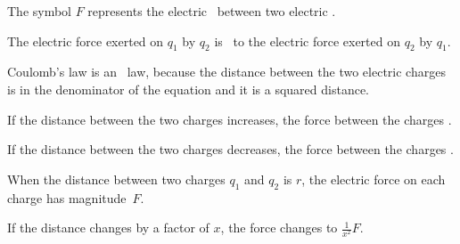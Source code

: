 \documentclass[]{exam}
\begin{document}
\begin{questions}
\question
The symbol $F$ represents the electric \fillin[force][3cm]\ between two electric \fillin[charges][3cm].

\question
The electric force exerted on $q_1$ by $q_2$ is \fillin[equal][3cm]\ to the electric force exerted on $q_2$ by $q_1$.

\question
Coulomb's law is an \ law, because the distance between the two electric charges is in the denominator of the equation and it is a squared distance.

\question 
If the distance between the two charges increases, the force between the charges \fillin[decreases][3cm].

\question
If the distance between the two charges decreases, the force between the charges \fillin[increases][3cm].

\question
When the distance between two charges $q_1$ and $q_2$ is $r$, the electric force on each charge has magnitude~$F$.

\begin{center}
\end{center}

If the distance changes by a factor of $x$, the force changes to $\displaystyle \frac{1}{x^2} F$.




\newcommand{\checkedbox}{%
  \ooalign{%
    $\square$\cr
    \hidewidth${\large \hspace{4pt}\checkmark}$\hidewidth\cr
  }%
}


\end{questions}
\end{document}
